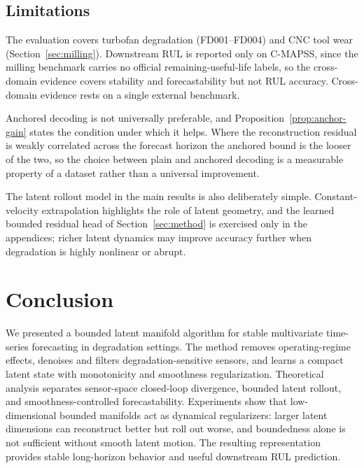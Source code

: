 \documentclass[a4paper,fleqn]{cas-sc}
\begin{document}
\subsection{Limitations}

The evaluation covers turbofan degradation (FD001--FD004) and CNC tool wear
(Section~\ref{sec:milling}). Downstream RUL is reported only on C-MAPSS, since
the milling benchmark carries no official remaining-useful-life labels, so the
cross-domain evidence covers stability and forecastability but not RUL
accuracy. Cross-domain evidence rests on a single external benchmark.

Anchored decoding is not universally preferable, and
Proposition~\ref{prop:anchor-gain} states the condition under which it helps.
Where the reconstruction residual is weakly correlated across the forecast
horizon the anchored bound is the looser of the two, so the choice between
plain and anchored decoding is a measurable property of a dataset rather than a
universal improvement.

The latent rollout model in the main results is also deliberately simple.
Constant-velocity extrapolation highlights the role of latent geometry, and the
learned bounded residual head of Section~\ref{sec:method} is exercised only in
the appendices; richer latent dynamics may improve accuracy further when
degradation is highly nonlinear or abrupt.

\section{Conclusion}

We presented a bounded latent manifold algorithm for stable multivariate
time-series forecasting in degradation settings. The method removes
operating-regime effects, denoises and filters degradation-sensitive sensors,
and learns a compact latent state with monotonicity and smoothness
regularization. Theoretical analysis separates sensor-space closed-loop
divergence, bounded latent rollout, and smoothness-controlled forecastability.
Experiments show that low-dimensional bounded manifolds act as dynamical
regularizers: larger latent dimensions can reconstruct better but roll out
worse, and boundedness alone is not sufficient without smooth latent motion.
The resulting representation provides stable long-horizon behavior and useful
downstream RUL prediction.
\end{document}
